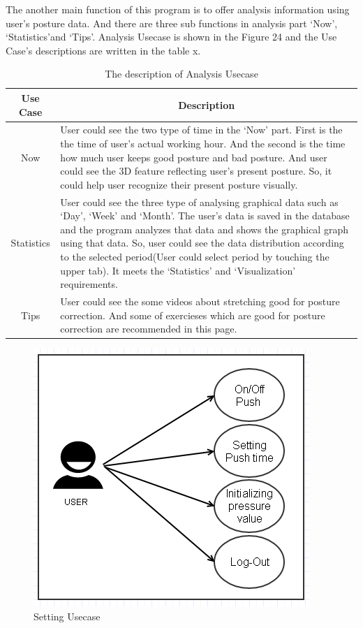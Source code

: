 \documentclass[conference]{IEEEtran}
\begin{document}
 The another main function of this program is to offer analysis information using user’s posture data. And there are three sub functions in analysis part ‘Now’, ‘Statistics’and ‘Tips’. Analysis Usecase is shown in the Figure 24 and the Use Case’s descriptions are written in the table x. 

\begin{table}[h]
{\renewcommand\arraystretch{1.25}
\caption{The description of Analysis Usecase}
\begin{tabular}{|c|l|l|} \hline
Use Case & \multicolumn{2}{c|}{Description} \\ \hline\hline
Now & \multicolumn{2}{p{6cm}|}{\raggedright User could see the two type of time in the ‘Now’ part. First is the the time of user’s actual working hour. And the second is the time how much user keeps good posture and bad posture. And user could see the 3D feature reflecting user’s present posture. So, it could help user recognize their present posture visually.} \\ \hline
Statistics & \multicolumn{2}{p{6cm}|}{\raggedright User could see the three type of analysing graphical data such as ‘Day’, ‘Week’ and ‘Month’. The user’s data is saved in the database and the program analyzes that data and shows the graphical graph using that data. So, user could see the data distribution according to the selected period(User could select period by touching the upper tab).  It meets the ‘Statistics’ and ‘Visualization’ requirements.} \\ \hline
Tips & \multicolumn{2}{p{6cm}|}{\raggedright User could see the some videos about stretching good for posture correction. And some of exercieses which are good for posture correction  are recommended in this page.} \\ \hline
\end{tabular}}
\end{table}

\begin{figure}[H]
\begin{center}
    \includegraphics[scale=0.8]{img_22.png}
    \caption{Setting Usecase} 
\end{center}
\end{figure}
  	        	  
\end{document}
